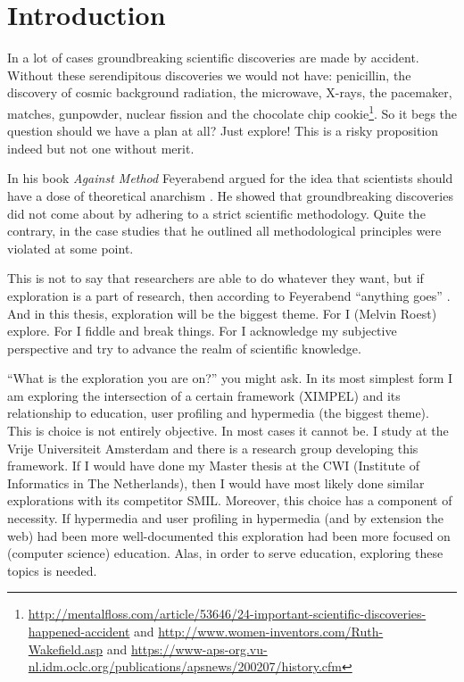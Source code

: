 \chapter{Introduction}
In a lot of cases groundbreaking scientific discoveries are made by accident. Without these serendipitous discoveries we would not have: penicillin, the discovery of cosmic background radiation, the microwave, X-rays, the pacemaker, matches, gunpowder, nuclear fission and the chocolate chip cookie\footnote{\url{http://mentalfloss.com/article/53646/24-important-scientific-discoveries-happened-accident} and \url{http://www.women-inventors.com/Ruth-Wakefield.asp} and \url{https://www-aps-org.vu-nl.idm.oclc.org/publications/apsnews/200207/history.cfm}}. So it begs the question should we have a plan at all? Just explore! This is a risky proposition indeed but not one without merit. 

In his book \textit{Against Method} Feyerabend argued for the idea that scientists should have a dose of theoretical anarchism \cite{feyerabend1993}. He showed that groundbreaking discoveries did not come about by adhering to a strict scientific methodology. Quite the contrary, in the case studies that he outlined all methodological principles were violated at some point. 

This is not to say that researchers are able to do whatever they want, but if exploration is a part of research, then according to Feyerabend ``anything goes'' \cite{feyerabend1993}. And in this thesis, exploration will be the biggest theme. For I (Melvin Roest) explore. For I fiddle and break things. For I acknowledge my subjective perspective and try to advance the realm of scientific knowledge. 

``What is the exploration you are on?'' you might ask. In its most simplest form I am exploring the intersection of a certain framework (XIMPEL) and its relationship to education, user profiling and hypermedia (the biggest theme). This is choice is not entirely objective. In most cases it cannot be. I study at the Vrije Universiteit Amsterdam and there is a research group developing this framework. If I would have done my Master thesis at the CWI (Institute of Informatics in The Netherlands), then I would have most likely done similar explorations with its competitor SMIL. Moreover, this choice has a component of necessity. If hypermedia and user profiling in hypermedia (and by extension the web) had been more well-documented this exploration had been more focused on (computer science) education. Alas, in order to serve education, exploring these topics is needed.

